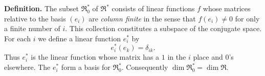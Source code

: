 \textbf{Definition.} The subset $\mathfrak{R}_0^*$ of $\mathfrak{R}^*$ consists of linear functions $f$ whose matrices relative to the basis $(e_i)$ are \textit{column finite} in the sense that $f(e_i) \neq 0$ for only a finite number of $i$. This collection constitutes a subspace of the conjugate space. For each $i$ we define a linear function $e_i^*$ by
$$e_i^*(e_k) = \delta_{ik}.$$
Thus $e_i^*$ is the linear function whose matrix has a $1$ in the $i$ place and $0$'s elsewhere. The $e_i^*$ form a basis for $\mathfrak{R}_0^*$. Consequently $\dim \mathfrak{R}_0^* = \dim \mathfrak{R}$.
